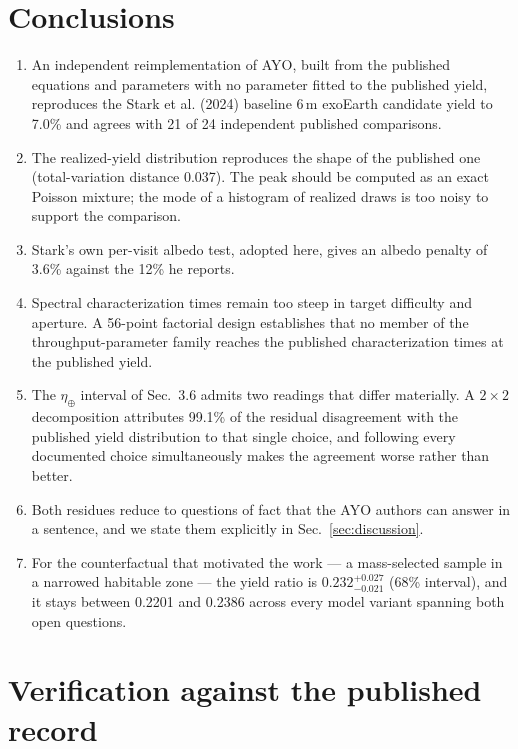 \documentclass[11pt,a4paper]{article}
\begin{document}
\section{Conclusions}

\begin{enumerate}
\item An independent reimplementation of AYO, built from the published equations and parameters
  with no parameter fitted to the published yield, reproduces the Stark et al. (2024) baseline
  $6\,$m exoEarth candidate yield to 7.0\% and agrees with 21 of
  24 independent published comparisons.
\item The realized-yield distribution reproduces the shape of the published one (total-variation
  distance 0.037). The peak should be computed as an exact Poisson mixture; the mode of a
  histogram of realized draws is too noisy to support the comparison.
\item Stark's own per-visit albedo test, adopted here, gives an albedo penalty of 3.6\%
  against the 12\% he reports.
\item Spectral characterization times remain too steep in target difficulty and aperture. A
  56-point factorial design establishes that no member of the throughput-parameter
  family reaches the published characterization times at the published yield.
\item The $\eta_\oplus$ interval of Sec.~3.6 admits two readings that differ materially. A
  $2\times2$ decomposition attributes 99.1\% of the residual disagreement with the
  published yield distribution to that single choice, and following every documented choice
  simultaneously makes the agreement worse rather than better.
\item Both residues reduce to questions of fact that the AYO authors can answer in a sentence, and
  we state them explicitly in Sec.~\ref{sec:discussion}.
\item For the counterfactual that motivated the work --- a mass-selected sample in a narrowed
  habitable zone --- the yield ratio is $0.232^{+0.027}_{-0.021}$ (68\%
  interval), and it stays between 0.2201 and 0.2386 across every model variant
  spanning both open questions.
\end{enumerate}

\appendix
\section{Verification against the published record}
\label{app:verification}
\end{document}
